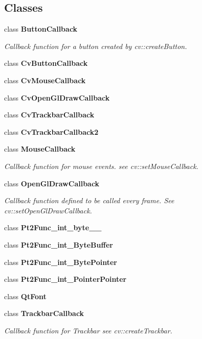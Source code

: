 \subsection*{Classes}
\begin{DoxyCompactItemize}
\item 
class {\bfseries Button\+Callback}
\begin{DoxyCompactList}\small\item\em Callback function for a button created by cv\+::create\+Button. \end{DoxyCompactList}\item 
class {\bfseries Cv\+Button\+Callback}
\item 
class {\bfseries Cv\+Mouse\+Callback}
\item 
class {\bfseries Cv\+Open\+Gl\+Draw\+Callback}
\item 
class {\bfseries Cv\+Trackbar\+Callback}
\item 
class {\bfseries Cv\+Trackbar\+Callback2}
\item 
class {\bfseries Mouse\+Callback}
\begin{DoxyCompactList}\small\item\em Callback function for mouse events. see cv\+::set\+Mouse\+Callback. \end{DoxyCompactList}\item 
class {\bfseries Open\+Gl\+Draw\+Callback}
\begin{DoxyCompactList}\small\item\em Callback function defined to be called every frame. See cv\+::set\+Open\+Gl\+Draw\+Callback. \end{DoxyCompactList}\item 
class {\bfseries Pt2\+Func\+\_\+int\+\_\+byte\+\_\+\+\_\+}
\item 
class {\bfseries Pt2\+Func\+\_\+int\+\_\+\+Byte\+Buffer}
\item 
class {\bfseries Pt2\+Func\+\_\+int\+\_\+\+Byte\+Pointer}
\item 
class {\bfseries Pt2\+Func\+\_\+int\+\_\+\+Pointer\+Pointer}
\item 
class {\bfseries Qt\+Font}
\item 
class {\bfseries Trackbar\+Callback}
\begin{DoxyCompactList}\small\item\em Callback function for Trackbar see cv\+::create\+Trackbar. \end{DoxyCompactList}\end{DoxyCompactItemize}
